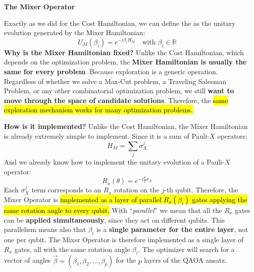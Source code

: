 \highspace
\begin{flushleft}
    \textcolor{Green3}{ \textbf{The Mixer Operator}}
\end{flushleft}
Exactly as we did for the Cost Hamiltonian, we can define the  as the unitary evolution generated by the Mixer Hamiltonian:
\begin{equation}\label{eq:mixer-operator}
    U_M\left(\beta_i\right) = e^{-i \beta_i H_M} \quad \text{with } \beta_i \in \mathbb{R}
\end{equation}
\textcolor{Green3}{ \textbf{Why is the Mixer Hamiltonian fixed?}} Unlike the Cost Hamiltonian, which depends on the optimization problem, the \textbf{Mixer Hamiltonian is usually the same for every problem}. Because exploration is a generic operation. Regardless of whether we solve a Max-Cut problem, a Traveling Salesman Problem, or any other combinatorial optimization problem, we still \textbf{want to move through the space of candidate solutions}. Therefore, the \hl{same exploration mechanism works for many optimization problems.}

\highspace
\textcolor{Green3}{ \textbf{How is it implemented?}} Unlike the Cost Hamiltonian, the Mixer Hamiltonian is already extremely simple to implement. Since it is a sum of Pauli-$X$ operators:
\begin{equation*}
    H_M = \sum_j \sigma_{X}^{j}
\end{equation*}
And we already know how to implement the unitary evolution of a Pauli-$X$ operator:
\begin{equation*}
    R_{x}\left(\theta\right) = e^{-i \frac{\theta}{2} \sigma_{X}}
\end{equation*}
Each $\sigma_{X}^{j}$ term corresponds to an $R_{x}$ rotation on the $j$-th qubit. Therefore, the Mixer Operator is \hl{implemented as a layer of parallel $R_{x}\left(\beta_i\right)$ gates applying the same rotation angle to every qubit.} With ``\emph{parallel}'' we mean that all the $R_{x}$ gates can be \textbf{applied simultaneously}, since they act on different qubits. This parallelism means also that $\beta_i$ is a \textbf{single parameter for the entire layer}, not one per qubit. The Mixer Operator is therefore implemented as a single layer of $R_{x}$ gates, all with the same rotation angle $\beta_i$. The optimizer will search for a vector of angles $\vec{\beta} = \left(\beta_1, \beta_2, \dots, \beta_p\right)$ for the $p$ layers of the QAOA ansatz.